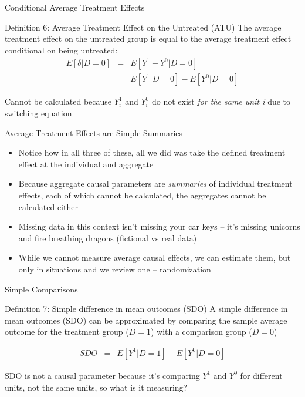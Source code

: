 \documentclass{beamer}
\begin{document}
\begin{frame}{Conditional Average Treatment Effects}

  \begin{block}{Definition 6: Average Treatment Effect on the Untreated (ATU)}
    The average treatment effect on the untreated group is equal to the average treatment effect conditional on being untreated:
    \begin{eqnarray*}
      E[\delta|D=0]&=&E[Y^1-Y^0|D=0] \nonumber \\
      &=&E[Y^1|D=0]-E[Y^0|D=0]
    \end{eqnarray*}
  \end{block}
  Cannot be calculated because $Y^1_i$ and $Y^0_i$ do not exist \emph{for the same unit i} due to switching equation

\end{frame}


\begin{frame}{Average Treatment Effects are Simple Summaries}

  \begin{itemize}
	\item Notice how in all three of these, all we did was take the defined treatment effect at the individual and aggregate
	\item Because aggregate causal parameters are \emph{summaries} of individual treatment effects, each of which cannot be calculated, the aggregates cannot be calculated either
	\item Missing data in this context isn't missing your car keys -- it's missing unicorns and fire breathing dragons (fictional vs real data)
	\item While we cannot measure average causal effects, we can estimate them, but only in situations and we review one -- randomization
  \end{itemize}

\end{frame}







\begin{frame}{Simple Comparisons}



  \begin{block}{Definition 7: Simple difference in mean outcomes (SDO)}
    A simple difference in mean outcomes (SDO) can be approximated by comparing the sample average outcome for the treatment group ($D=1$) with a comparison group ($D=0$)
    
    \begin{eqnarray*}
      SDO &=& E[Y^1 | D=1] - E[Y^0 | D=0]
    \end{eqnarray*}
  \end{block}
  \bigskip

SDO is not a causal parameter because it's comparing $Y^1$ and $Y^0$ for different units, not the same units, so what is it measuring? 

\end{frame}
\end{document}

